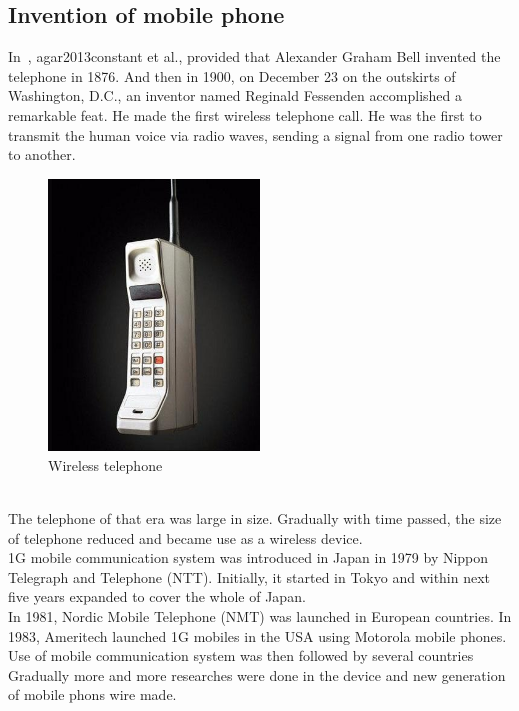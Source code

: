 \subsection{Invention of mobile phone}
In~\cite{agar2013constant}, agar2013constant et al., provided that  Alexander Graham Bell invented the telephone in 1876. And then in 1900, on December 23 on the outskirts of Washington, D.C., an inventor named Reginald Fessenden accomplished a remarkable feat. He made the first wireless telephone call. He was the first to transmit the human voice via radio waves, sending a signal from one radio tower to another.
\begin{figure}[h]
    \centering
    \includegraphics[width = 0.5\textwidth]{pic/first_cellphone.jpeg}
    \caption{Wireless telephone}
    \label{fig:fig5}
\end{figure}\\
The telephone of that era was large in size. Gradually with time passed, the size of telephone reduced and became use as a wireless device. \\1G mobile communication system was introduced in Japan in 1979 by Nippon Telegraph and Telephone (NTT). Initially, it started in Tokyo and within next five years expanded to cover the whole of Japan.\\
In 1981, Nordic Mobile Telephone (NMT) was launched in European countries. In 1983, Ameritech launched 1G mobiles in the USA using Motorola mobile phones. Use of mobile communication system was then followed by several countries\\
Gradually more and more researches were done in the device and new generation of mobile phons wire made.
